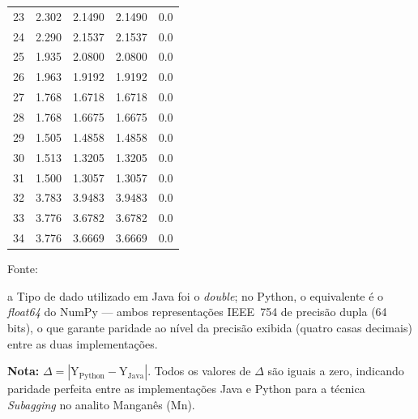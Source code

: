 \begin{table}[H]
\begin{threeparttable}
{\begin{tabular}{
    S[table-format=2.0]
    S[table-format=2.3]
    S[table-format=2.4]
    S[table-format=2.4]
    S[table-format=1.1]
}
23  &  2.302  &  2.1490  &  2.1490  & 0.0 \\
24  &  2.290  &  2.1537  &  2.1537  & 0.0 \\
25  &  1.935  &  2.0800  &  2.0800  & 0.0 \\
26  &  1.963  &  1.9192  &  1.9192  & 0.0 \\
27  &  1.768  &  1.6718  &  1.6718  & 0.0 \\
28  &  1.768  &  1.6675  &  1.6675  & 0.0 \\
29  &  1.505  &  1.4858  &  1.4858  & 0.0 \\
30  &  1.513  &  1.3205  &  1.3205  & 0.0 \\
31  &  1.500  &  1.3057  &  1.3057  & 0.0 \\
32  &  3.783  &  3.9483  &  3.9483  & 0.0 \\
33  &  3.776  &  3.6782  &  3.6782  & 0.0 \\
34  &  3.776  &  3.6669  &  3.6669  & 0.0 \\
\bottomrule
\end{tabular}%
}
\begin{center}
\begin{minipage}{0.85\linewidth}
\begin{tablenotes}
\footnotesize
\item Fonte:~\oautor
\item[a] Tipo de dado utilizado em Java foi o \textit{double}; no Python,
o equivalente é o \textit{float64} do NumPy — ambos representações IEEE~754
de precisão dupla (64 bits), o que garante paridade ao nível da precisão exibida (quatro casas decimais) entre as
duas implementações.
\item \textbf{Nota:} $\Delta = |\text{Y}_{\text{Python}} - \text{Y}_{\text{Java}}|$.
Todos os valores de $\Delta$ são iguais a zero, indicando paridade
perfeita entre as implementações Java e Python para a técnica \textit{Subagging}
no analito Manganês (Mn).
\end{tablenotes}
\end{minipage}
\end{center}
\end{threeparttable}
\end{table}

